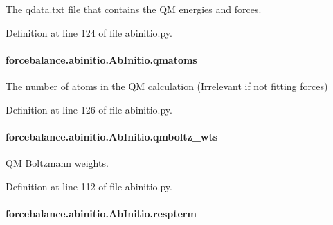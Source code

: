 The qdata.\-txt file that contains the Q\-M energies and forces. 



Definition at line 124 of file abinitio.\-py.

\hypertarget{classforcebalance_1_1abinitio_1_1AbInitio_af0760b8d33ce9dd044ccbe68fba7a1be}{
\paragraph[{qmatoms}]{\setlength{\rightskip}{0pt plus 5cm}forcebalance.\-abinitio.\-Ab\-Initio.\-qmatoms\hspace{0.3cm}{\ttfamily [inherited]}}}\label{classforcebalance_1_1abinitio_1_1AbInitio_af0760b8d33ce9dd044ccbe68fba7a1be}


The number of atoms in the Q\-M calculation (Irrelevant if not fitting forces) 



Definition at line 126 of file abinitio.\-py.

\hypertarget{classforcebalance_1_1abinitio_1_1AbInitio_a06ec6b12d81791ca94f599f41e56335a}{
\paragraph[{qmboltz\-\_\-wts}]{\setlength{\rightskip}{0pt plus 5cm}forcebalance.\-abinitio.\-Ab\-Initio.\-qmboltz\-\_\-wts\hspace{0.3cm}{\ttfamily [inherited]}}}\label{classforcebalance_1_1abinitio_1_1AbInitio_a06ec6b12d81791ca94f599f41e56335a}


Q\-M Boltzmann weights. 



Definition at line 112 of file abinitio.\-py.

\hypertarget{classforcebalance_1_1abinitio_1_1AbInitio_a689e3849518b33539442a473a41ed32d}{
\paragraph[{respterm}]{\setlength{\rightskip}{0pt plus 5cm}forcebalance.\-abinitio.\-Ab\-Initio.\-respterm\hspace{0.3cm}{\ttfamily [inherited]}}}\label{classforcebalance_1_1abinitio_1_1AbInitio_a689e3849518b33539442a473a41ed32d}


